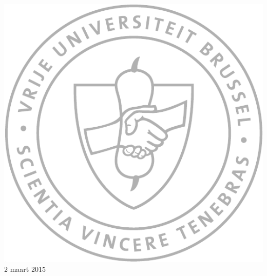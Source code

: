 \begin{titlepage}
\vspace{0.6cm}

\includegraphics[scale=0.4]{VUB_schild.pdf}\\[0.5cm]

{\large 2 maart 2015}
\vfill %

\end{titlepage}